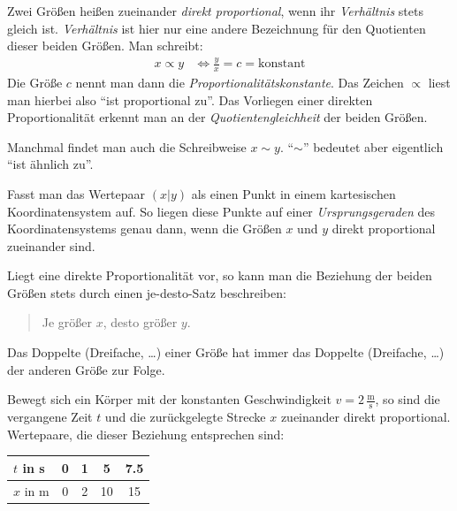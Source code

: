 \begin{defi}

Zwei Größen heißen zueinander \emph{direkt proportional}, wenn ihr \emph{Verhältnis} stets gleich ist. \emph{Verhältnis} ist hier nur eine andere Bezeichnung für den Quotienten dieser beiden Größen. Man schreibt:
\begin{align*}
 x \propto y &\Leftrightarrow \frac{y}{x}= c = \text{konstant}
\end{align*}
Die Größe \(c\) nennt man dann die \emph{Proportionalitätskonstante}. Das Zeichen \(\propto\) liest man hierbei also "`ist proportional zu"'. Das Vorliegen einer direkten Proportionalität erkennt man an der \emph{Quotientengleichheit} der beiden Größen.

Manchmal findet man auch die Schreibweise \(x\sim y\). "`\(\sim\)"' bedeutet aber eigentlich "`ist ähnlich zu"'.

Fasst man das Wertepaar \((x\vert y)\) als einen Punkt in einem kartesischen Koordinatensystem auf. So liegen diese Punkte auf einer \emph{Ursprungsgeraden} des Koordinatensystems genau dann, wenn die Größen \(x\) und \(y\) direkt proportional zueinander sind.

Liegt eine direkte Proportionalität vor, so kann man die Beziehung der beiden Größen stets durch einen je-desto-Satz beschreiben:
\begin{quote}
 Je größer \(x\), desto größer \(y\).
\end{quote}
Das Doppelte (Dreifache, \ldots) einer Größe hat immer das Doppelte (Dreifache, \ldots) der anderen Größe zur Folge.
\end{defi}

\begin{bsp}
 Bewegt sich ein Körper mit der konstanten Geschwindigkeit \(v=2\,\frac{\text{m}}{\text{s}}\), so sind die vergangene Zeit \(t\) und die zurückgelegte Strecke \(x\) zueinander direkt proportional. Wertepaare, die dieser Beziehung entsprechen sind:
 \begin{table}
 \centering
 \begin{tabular}{l| cccc}
  \(t\) in s & 0 & 1 & 5 & 7.5 \\ \hline
  \(x\) in m & 0 & 2 & 10 & 15
 \end{tabular}
 \end{table}
\end{bsp}

